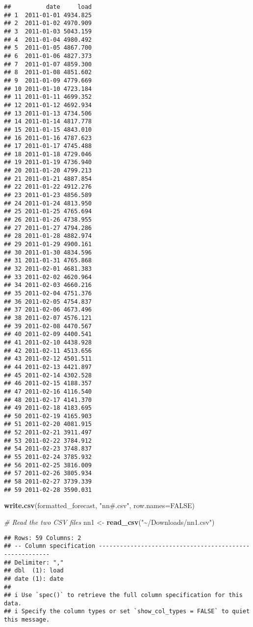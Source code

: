 \documentclass[
]{article}
\newenvironment{Shaded}{\begin{snugshade}}{\end{snugshade}}
\newcommand{\AttributeTok}[1]{\textcolor[rgb]{0.13,0.29,0.53}{#1}}
\newcommand{\CommentTok}[1]{\textcolor[rgb]{0.56,0.35,0.01}{\textit{#1}}}
\newcommand{\ConstantTok}[1]{\textcolor[rgb]{0.56,0.35,0.01}{#1}}
\newcommand{\FunctionTok}[1]{\textcolor[rgb]{0.13,0.29,0.53}{\textbf{#1}}}
\newcommand{\NormalTok}[1]{#1}
\newcommand{\OtherTok}[1]{\textcolor[rgb]{0.56,0.35,0.01}{#1}}
\newcommand{\StringTok}[1]{\textcolor[rgb]{0.31,0.60,0.02}{#1}}
\begin{document}
\begin{verbatim}
##          date     load
## 1  2011-01-01 4934.825
## 2  2011-01-02 4970.909
## 3  2011-01-03 5043.159
## 4  2011-01-04 4980.492
## 5  2011-01-05 4867.700
## 6  2011-01-06 4827.373
## 7  2011-01-07 4859.300
## 8  2011-01-08 4851.602
## 9  2011-01-09 4779.669
## 10 2011-01-10 4723.184
## 11 2011-01-11 4699.352
## 12 2011-01-12 4692.934
## 13 2011-01-13 4734.506
## 14 2011-01-14 4817.778
## 15 2011-01-15 4843.010
## 16 2011-01-16 4787.623
## 17 2011-01-17 4745.488
## 18 2011-01-18 4729.046
## 19 2011-01-19 4736.940
## 20 2011-01-20 4799.213
## 21 2011-01-21 4887.854
## 22 2011-01-22 4912.276
## 23 2011-01-23 4856.589
## 24 2011-01-24 4813.950
## 25 2011-01-25 4765.694
## 26 2011-01-26 4738.955
## 27 2011-01-27 4794.286
## 28 2011-01-28 4882.974
## 29 2011-01-29 4900.161
## 30 2011-01-30 4834.596
## 31 2011-01-31 4765.868
## 32 2011-02-01 4681.383
## 33 2011-02-02 4620.964
## 34 2011-02-03 4660.216
## 35 2011-02-04 4751.376
## 36 2011-02-05 4754.837
## 37 2011-02-06 4673.496
## 38 2011-02-07 4576.121
## 39 2011-02-08 4470.567
## 40 2011-02-09 4400.541
## 41 2011-02-10 4438.928
## 42 2011-02-11 4513.656
## 43 2011-02-12 4501.511
## 44 2011-02-13 4421.897
## 45 2011-02-14 4302.528
## 46 2011-02-15 4188.357
## 47 2011-02-16 4116.540
## 48 2011-02-17 4141.370
## 49 2011-02-18 4183.695
## 50 2011-02-19 4165.903
## 51 2011-02-20 4081.915
## 52 2011-02-21 3911.497
## 53 2011-02-22 3784.912
## 54 2011-02-23 3748.837
## 55 2011-02-24 3785.932
## 56 2011-02-25 3816.009
## 57 2011-02-26 3805.934
## 58 2011-02-27 3739.339
## 59 2011-02-28 3590.031
\end{verbatim}

\begin{Shaded}
\begin{Highlighting}[]
\FunctionTok{write.csv}\NormalTok{(formatted\_forecast, }\StringTok{"nn\#.csv"}\NormalTok{, }\AttributeTok{row.names=}\ConstantTok{FALSE}\NormalTok{)}
\end{Highlighting}
\end{Shaded}

\begin{Shaded}
\begin{Highlighting}[]
\CommentTok{\# Read the two CSV files}
\NormalTok{nn1 }\OtherTok{\textless{}{-}} \FunctionTok{read\_csv}\NormalTok{(}\StringTok{"\textasciitilde{}/Downloads/nn1.csv"}\NormalTok{)   }
\end{Highlighting}
\end{Shaded}

\begin{verbatim}
## Rows: 59 Columns: 2
## -- Column specification --------------------------------------------------------
## Delimiter: ","
## dbl  (1): load
## date (1): date
## 
## i Use `spec()` to retrieve the full column specification for this data.
## i Specify the column types or set `show_col_types = FALSE` to quiet this message.
\end{verbatim}
\end{document}
